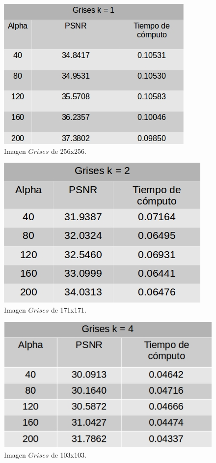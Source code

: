 \documentclass[a4paper]{article}
\begin{document}
    
    
    \begin{figure}[H]
    \centering
    \includegraphics[scale=0.4]{imagenes/grises1.jpg}
    \caption{Imagen $Grises$ de 256x256.}
	\label{grisese}
    \end{figure}
    
     \begin{figure}[H]
    \centering
    \includegraphics[scale=0.4]{imagenes/grises2.jpg}
    \caption{Imagen $Grises$ de 171x171.}
	\label{grisese}
    \end{figure}
    
     \begin{figure}[H]
    \centering
    \includegraphics[scale=0.4]{imagenes/grises4.jpg}
    \caption{Imagen $Grises$ de 103x103.}
	\label{grisese}
    \end{figure}
    
\end{document}
